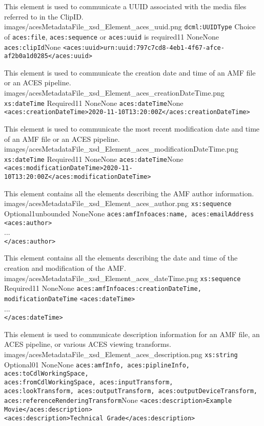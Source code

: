 		{This element is used to communicate a UUID associated with the media files referred to in the ClipID.}
		{images/acesMetadataFile_xsd_Element_aces_uuid.png}
		{\texttt{dcml:UUIDType}}
		{Choice of \texttt{aces:file}, \texttt{aces:sequence} or \texttt{aces:uuid} is required}{1}{1}
		{None}{None}
		{\texttt{aces:clipId}}{None}
		{\lstinline{<aces:uuid>urn:uuid:797c7cd8-4eb1-4f67-afce-af2b0a1d0285</aces:uuid>}}

		{This element is used to communicate the creation date and time of an AMF file or an ACES pipeline.}
		{images/acesMetadataFile_xsd_Element_aces_creationDateTime.png}
		{\texttt{xs:dateTime}}
		{Required}{1}{1}
		{None}{None}
		{\texttt{aces:dateTime}}{None}
		{\lstinline{<aces:creationDateTime>2020-11-10T13:20:00Z</aces:creationDateTime>}}

		{This element is used to communicate the most recent modification date and time of an AMF file or an ACES pipeline.}
		{images/acesMetadataFile_xsd_Element_aces_modificationDateTime.png}
		{\texttt{xs:dateTime}}
		{Required}{1}{1}
		{None}{None}
		{\texttt{aces:dateTime}}{None}
		{\lstinline{<aces:modificationDateTime>2020-11-10T13:20:00Z</aces:modificationDateTime>}}

		{This element contains all the elements describing the AMF author information.}
		{images/acesMetadataFile_xsd_Element_aces_author.png}
		{\texttt{xs:sequence}}
		{Optional}{1}{unbounded}
		{None}{None}
		{\texttt{aces:amfInfo}}{\texttt{aces:name, aces:emailAddress}}
		{\lstinline{<aces:author>} \\
        ... \\
        \lstinline{</aces:author>}}

		{This element contains all the elements describing the date and time of the creation and modification of the AMF.}
		{images/acesMetadataFile_xsd_Element_aces_dateTime.png}
		{\texttt{xs:sequence}}
		{Required}{1}{1}
		{None}{None}
		{\texttt{aces:amfInfo}}{\texttt{aces:creationDateTime, modificationDateTime}}
		{\lstinline{<aces:dateTime>} \\
        ... \\
        \lstinline{</aces:dateTime>}}

		{This element is used to communicate description information for an AMF file, an ACES pipeline, or various ACES viewing transforms.}
		{images/acesMetadataFile_xsd_Element_aces_description.png}
		{\texttt{xs:string}}
		{Optional}{0}{1}
		{None}{None}
		{\texttt{aces:amfInfo, aces:piplineInfo, aces:toCdlWorkingSpace,\\ aces:fromCdlWorkingSpace, aces:inputTransform,\\
		  aces:lookTransform, aces:outputTransform, aces:outputDeviceTransform, \\
		  aces:referenceRenderingTransform}}{None}
		{\lstinline{<aces:description>Example Movie</aces:description>}\\
		 \lstinline{<aces:description>Technical Grade</aces:description>}}

